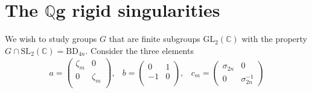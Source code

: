 \documentclass[11pt]{amsart}
\theoremstyle{definition}
\theoremstyle{definition}
\theoremstyle{definition}
\theoremstyle{definition}
\theoremstyle{definition}
\theoremstyle{definition}
\theoremstyle{definition}
\theoremstyle{definition}
\newcommand{\spl}{\text{SL}_2 (\mathbb{C})}
\newcommand{\gl}{\text{GL}_2 (\mathbb{C})}
\begin{document}
 

\section{The $\mathbb{Q}$g rigid singularities}

We wish to study groups $G$ that are finite subgroups $\gl$ with the property $G \cap \spl = \text{BD}_{4n}$. Consider the three elements
\[
\begin{array}{ccc}
a = \left(
\begin{array}{cc}
\zeta_{m} & 0  \\
0 & \zeta_{m} \\
\end{array} \right), &
b = \left(
\begin{array}{cc}
0 & 1  \\
-1 & 0 \\
\end{array} \right), &c_m =
\left( \begin{array}{cc}
\sigma_{2n} & 0 \\
0 & \sigma^{-1}_{2n}
\end{array} \right) 
\end{array}
\]
\end{document}
